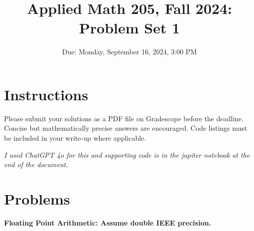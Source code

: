 \documentclass[12pt]{article}
\title{Applied Math 205, Fall 2024: Problem Set 1}
\author{}
\date{Due: Monday, September 16, 2024, 3:00 PM}
\begin{document}
\maketitle

\section*{Instructions}
Please submit your solutions as a PDF file on Gradescope before the deadline. Concise but mathematically precise answers are encouraged. Code listings must be included in your write-up where applicable. 

\emph{I used ChatGPT 4o for this and supporting code is in the jupiter notebook at the end of the document.}

\section*{Problems}

\textbf{Floating Point Arithmetic: Assume double IEEE precision.}
\end{document}
